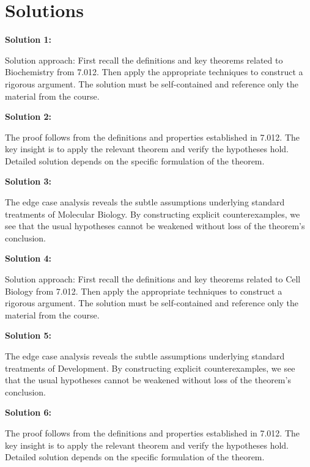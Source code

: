\documentclass[12pt,a4paper]{exam}
\begin{document}
\newpage
\section*{Solutions}

\textbf{Solution 1:}

Solution approach: First recall the definitions and key theorems related to Biochemistry from 7.012. Then apply the appropriate techniques to construct a rigorous argument. The solution must be self-contained and reference only the material from the course.

\vspace{0.5cm}

\textbf{Solution 2:}

The proof follows from the definitions and properties established in 7.012. The key insight is to apply the relevant theorem and verify the hypotheses hold. Detailed solution depends on the specific formulation of the theorem.

\vspace{0.5cm}

\textbf{Solution 3:}

The edge case analysis reveals the subtle assumptions underlying standard treatments of Molecular Biology. By constructing explicit counterexamples, we see that the usual hypotheses cannot be weakened without loss of the theorem's conclusion.

\vspace{0.5cm}

\textbf{Solution 4:}

Solution approach: First recall the definitions and key theorems related to Cell Biology from 7.012. Then apply the appropriate techniques to construct a rigorous argument. The solution must be self-contained and reference only the material from the course.

\vspace{0.5cm}

\textbf{Solution 5:}

The edge case analysis reveals the subtle assumptions underlying standard treatments of Development. By constructing explicit counterexamples, we see that the usual hypotheses cannot be weakened without loss of the theorem's conclusion.

\vspace{0.5cm}

\textbf{Solution 6:}

The proof follows from the definitions and properties established in 7.012. The key insight is to apply the relevant theorem and verify the hypotheses hold. Detailed solution depends on the specific formulation of the theorem.
\end{document}
